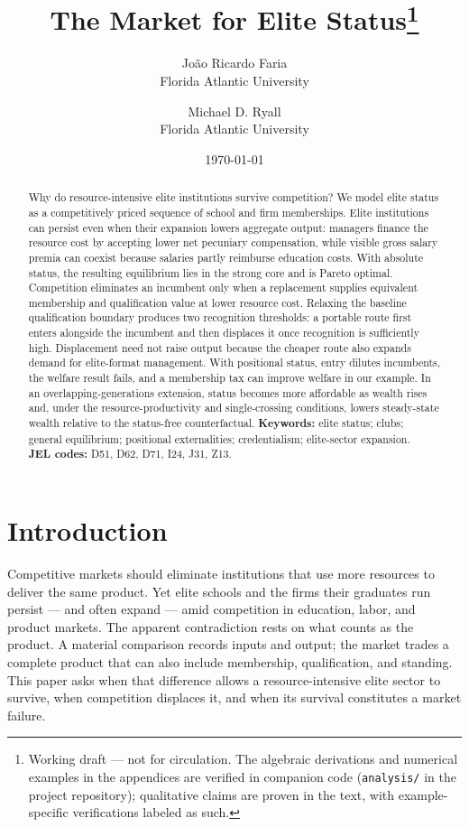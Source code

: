 \documentclass[12pt,letterpaper]{article}
\title{The Market for Elite Status\thanks{Working draft --- not for circulation.
The algebraic derivations and numerical examples in the appendices are verified in companion code (\texttt{analysis/} in the project repository); qualitative claims are proven in the text, with example-specific verifications labeled as such.}}
\author{Jo\~{a}o Ricardo Faria\\ Florida Atlantic University
  \and Michael D. Ryall\\ Florida Atlantic University}
\date{\today}
\theoremstyle{definition}
\begin{document}
\maketitle

\begin{abstract}
\noindent Why do resource-intensive elite institutions survive competition?
We model elite status as a competitively priced sequence of school and firm memberships.
Elite institutions can persist even when their expansion lowers aggregate output: managers finance the resource cost by accepting lower net pecuniary compensation, while visible gross salary premia can coexist because salaries partly reimburse education costs.
With absolute status, the resulting equilibrium lies in the strong core and is Pareto optimal.
Competition eliminates an incumbent only when a replacement supplies equivalent membership and qualification value at lower resource cost.
Relaxing the baseline qualification boundary produces two recognition thresholds: a portable route first enters alongside the incumbent and then displaces it once recognition is sufficiently high.
Displacement need not raise output because the cheaper route also expands demand for elite-format management.
With positional status, entry dilutes incumbents, the welfare result fails, and a membership tax can improve welfare in our example.
In an overlapping-generations extension, status becomes more affordable as wealth rises and, under the resource-productivity and single-crossing conditions, lowers steady-state wealth relative to the status-free counterfactual.
\medskip
\noindent\textbf{Keywords:} elite status; clubs; general equilibrium; positional externalities; credentialism; elite-sector expansion.\\
\textbf{JEL codes:} D51, D62, D71, I24, J31, Z13.
\end{abstract}

\onehalfspacing

\section{Introduction}\label{sec:intro}

Competitive markets should eliminate institutions that use more resources to deliver the
same product.
Yet elite schools and the firms their graduates run persist --- and often expand --- amid
competition in education, labor, and product markets.
The apparent contradiction rests on what counts as the product.
A material comparison records inputs and output; the market trades a complete product
that can also include membership, qualification, and standing.
This paper asks when that difference allows a resource-intensive elite sector to survive,
when competition displaces it, and when its survival constitutes a market failure.
\end{document}
